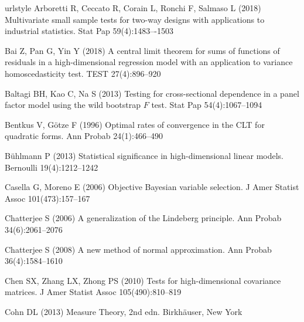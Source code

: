 \documentclass[smallextended]{svjour3}       %
\begin{document}
%
\begin{thebibliography}{}
\providecommand{\natexlab}[1]{#1}
\providecommand{\url}[1]{{#1}}
\providecommand{\urlprefix}{URL }
\expandafter\ifx\csname urlstyle\endcsname\relax
  \providecommand{\doi}[1]{DOI~\discretionary{}{}{}#1}\else
  \providecommand{\doi}{DOI~\discretionary{}{}{}\begingroup
  \urlstyle{rm}\Url}\fi
\providecommand{\eprint}[2][]{\url{#2}}
    Arboretti R, Ceccato R, Corain L, Ronchi F, Salmaso L (2018) Multivariate small sample tests for two-way designs with applications to industrial statistics. Stat Pap 59(4):1483–-1503

Bai Z, Pan G, Yin Y (2018) A central limit theorem for sums of functions of
  residuals in a high-dimensional regression model with an application to
  variance homoscedasticity test. {TEST} 27(4):896--920

    Baltagi BH, Kao C, Na S (2013) Testing for cross-sectional dependence in a panel factor model using the wild bootstrap $F$ test. Stat Pap 54(4):1067--1094



Bentkus V, G\"otze F (1996) Optimal rates of convergence in the {CLT} for
  quadratic forms. Ann Probab 24(1):466--490

B\"uhlmann P (2013) Statistical significance in high-dimensional linear models.
  Bernoulli 19(4):1212--1242

Casella G, Moreno E (2006) Objective Bayesian variable selection. J Amer Statist Assoc 101(473):157--167

Chatterjee S (2006) A generalization of the Lindeberg principle. Ann Probab 34(6):2061--2076

Chatterjee S (2008) A new method of normal approximation. Ann Probab 36(4):1584--1610

Chen SX, Zhang LX, Zhong PS (2010) Tests for high-dimensional covariance
  matrices. J Amer Statist Assoc 105(490):810--819

Cohn DL (2013) Measure Theory, 2nd edn. Birkh\"auser, New York


\end{thebibliography}
\end{document}
